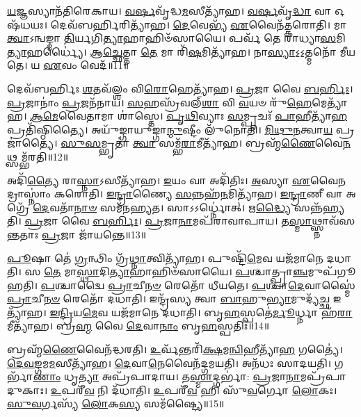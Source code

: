 \-\ul{𑌯}\-𑌜𑍍𑌞𑌸𑍍𑌯𑌾𑌨᳴𑌤𑌿𑌰𑍇𑌕𑌾𑌯।
\-\ul{𑌵}\-\-\ul{𑌰𑍍}\-𑌷𑌵𑍃᳴𑌦𑍍𑌧\-\ul{𑌮}\-𑌸𑍀𑌤𑍍𑌯𑌾᳴𑌹।
\-\ul{𑌵}\-\-\ul{𑌰𑍍}\-𑌷𑌵𑍃᳴\-\ul{𑌦𑍍𑌧𑌾} 𑌵𑌾 𑌓𑌷᳴𑌧𑌯𑌃।
𑌦𑍇𑌵᳴𑌬𑌰𑍍\mbox{}\-\ul{𑌹𑌿}\-𑌰𑌿𑌤𑍍𑌯𑌾᳴𑌹।
\-\ul{𑌦𑍇}\-𑌵𑍇𑌭𑍍𑌯᳴ \ul{𑌏}\-𑌵𑍈𑌨᳴𑌤𑍍𑌕𑌰𑍋𑌤𑌿।
𑌮𑌾 \ul{𑌤𑍍𑌵𑌾}\-\-𑌽𑌨𑍍𑌵𑌙𑍍𑌮𑌾 \ul{𑌤𑌿}\-𑌰𑍍𑌯𑌗𑌿\-\ul{𑌤𑍍𑌯𑌾}\-𑌹𑌾𑌹𑌿𑍞᳴𑌸𑌾𑌯𑍈।
𑌪𑌰𑍍𑌵᳴ 𑌤𑍇 𑌰𑌾𑌧𑍍𑌯𑌾\-\ul{𑌸}\-𑌮𑌿\-\ul{𑌤𑍍𑌯𑌾}\-𑌹𑌰𑍍𑌧𑍍𑌯𑍈॑।
\-\ul{𑌆}\-\-\ul{𑌚𑍍𑌛𑍇}\-𑌤𑍍𑌤𑌾 \ul{𑌤𑍇} 𑌮𑌾 𑌰𑌿᳴\-\ul{𑌷}\-𑌮𑌿𑌤𑍍𑌯𑌾᳴𑌹।
𑌨𑌾\-\ul{𑌸𑍍𑌯𑌾}\-𑌽॒𑌽॒𑌤𑍍𑌮𑌨𑍋᳴ 𑌮𑍀𑌯𑌤𑍇।
𑌯 \ul{𑌏}\-𑌵𑌂 𑌵𑍇𑌦᳴॥11॥

𑌦𑍇𑌵᳴𑌬𑌰𑍍\mbox{}𑌹𑌿𑌃 \ul{𑌶}\-𑌤𑌵᳴𑌲𑍍\mbox{}\-\ul{𑌶𑌂} 𑌵𑌿\-\ul{𑌰𑍋}\-𑌹𑍇𑌤𑍍𑌯𑌾᳴𑌹।
\-\ul{𑌪𑍍𑌰}\-𑌜𑌾 𑌵𑍈 \ul{𑌬}\-\-\ul{𑌰𑍍}\-𑌹𑌿𑌃।
\-\ul{𑌪𑍍𑌰}\-𑌜𑌾𑌨𑌾𑌂॑ \ul{𑌪𑍍𑌰}\-𑌜𑌨᳴𑌨𑌾𑌯।
\-\ul{𑌸}\-𑌹𑌸𑍍𑌰᳴𑌵𑌲𑍍‌\-\ul{𑌶𑌾} 𑌵𑌿 \ul{𑌵}\-𑌯𑍞 𑌰𑍁᳴\-\ul{𑌹𑍇}\-𑌮𑍇𑌤𑍍𑌯𑌾᳴𑌹।
\-\ul{𑌆}\-\-\-\ul{𑌮𑍇}\-𑌵𑍈𑌤𑌾𑌮𑌾 𑌶𑌾॑𑌸𑍍𑌤𑍇।
\-\ul{𑌪𑍃}\-\-\ul{𑌥𑌿}\-𑌵𑍍𑌯𑌾𑌃 \ul{𑌸}\-𑌮𑍍𑌪𑍃𑌚𑌃᳴ \ul{𑌪𑌾}\-𑌹𑍀𑌤𑍍𑌯𑌾᳴\-\ul{𑌹} 𑌪𑍍𑌰𑌤𑌿᳴\-𑌷𑍍𑌠𑌿𑌤𑍍𑌯𑍈।
𑌅𑌯𑍁᳴𑌙𑍍𑌗𑌾𑌯𑍁𑌙𑍍𑌗𑌾\-\ul{𑌨𑍍𑌮𑍁}\-𑌷𑍍𑌟𑍀𑌂 𑌲𑍁᳴𑌨𑍋𑌤𑌿।
\-\ul{𑌮𑌿}\-\-\ul{𑌥𑍁}\-\-\ul{𑌨}\-𑌤𑍍𑌵𑌾\-\ul{𑌯} 𑌪𑍍𑌰𑌜𑌾॑𑌤𑍍𑌯𑍈।
\-\ul{𑌸𑍁}\-\-\ul{𑌸}\-𑌮𑍍𑌭𑍃𑌤𑌾॑ \ul{𑌤𑍍𑌵𑌾} 𑌸𑌮𑍍𑌭᳴\-\ul{𑌰𑌾}\-𑌮𑍀𑌤𑍍𑌯𑌾᳴𑌹।
𑌬𑍍𑌰𑌹𑍍𑌮᳴\-\ul{𑌣𑍈}\-𑌵𑍈\-\ul{𑌨}\-𑌥𑍍𑌸𑌮𑍍𑌭᳴𑌰𑌤𑌿॥12॥

𑌅𑌦𑌿᳴\-\ul{𑌤𑍍𑌯𑍈} 𑌰𑌾\-\ul{𑌸𑍍𑌨𑌾}\-\-𑌽𑌸𑍀𑌤𑍍𑌯𑌾᳴𑌹।
\-\ul{𑌇}\-𑌯𑌂 𑌵𑌾 𑌅𑌦𑌿᳴𑌤𑌿𑌃।
\-\ul{𑌅}\-𑌸𑍍𑌯𑌾 \ul{𑌏}\-𑌵𑍈\-\ul{𑌨}\-𑌦𑍍𑌰𑌾𑌸𑍍𑌨𑌾𑌂॑ 𑌕𑌰𑍋𑌤𑌿।
\-\ul{𑌇}\-\-\ul{𑌨𑍍𑌦𑍍𑌰𑌾}\-𑌣𑍍𑌯𑍈 \ul{𑌸}\-𑌨𑍍𑌨𑌹᳴\-\ul{𑌨}\-𑌮𑌿𑌤𑍍𑌯𑌾᳴𑌹।
\-\ul{𑌇}\-\-\ul{𑌨𑍍𑌦𑍍𑌰𑌾}\-𑌣𑍀 𑌵𑌾 𑌅𑌗𑍍𑌰𑍇᳴ \ul{𑌦𑍇}\-𑌵𑌤𑌾᳴\-\ul{𑌨𑌾}\-\-\ul{𑍞} 𑌸𑌮᳴𑌨𑌹𑍍𑌯𑌤।
𑌸𑌾𑌽𑌽𑌰𑍍𑌧𑍍𑌨𑍋॑𑌤𑍍।
𑌋\-\ul{𑌦𑍍𑌧𑍍𑌯𑍈} 𑌸𑌨𑍍𑌨᳴𑌹𑍍𑌯𑌤𑌿।
\-\ul{𑌪𑍍𑌰}\-𑌜𑌾 𑌵𑍈 \ul{𑌬}\-\-\ul{𑌰𑍍}\-𑌹𑌿𑌃।
\-\ul{𑌪𑍍𑌰}\-𑌜𑌾\-\ul{𑌨𑌾}\-𑌮𑌪᳴𑌰𑌾𑌵𑌾𑌪𑌾𑌯।
𑌤\-\ul{𑌸𑍍𑌮𑌾}\-𑌥𑍍𑌸𑍍𑌨𑌾𑌵᳴𑌸𑌨𑍍𑌤𑌤𑌾𑌃 \ul{𑌪𑍍𑌰}\-𑌜𑌾 𑌜𑌾᳴𑌯𑌨𑍍𑌤𑍇॥13॥

\-\ul{𑌪𑍂}\-𑌷𑌾 𑌤𑍇॑ \ul{𑌗𑍍𑌰}\-𑌨𑍍𑌥𑌿𑌂 𑌗𑍍𑌰᳴\-\ul{𑌥𑍍𑌨𑌾}\-𑌤𑍍𑌵𑌿𑌤𑍍𑌯𑌾᳴𑌹।
𑌪𑍁𑌷𑍍𑌟𑌿᳴\-\ul{𑌮𑍇}\-𑌵 𑌯𑌜᳴𑌮𑌾𑌨𑍇 𑌦𑌧𑌾𑌤𑌿।
𑌸 \ul{𑌤𑍇} 𑌮𑌾\-\ul{𑌸𑍍𑌥𑌾}\-𑌦𑌿\-\ul{𑌤𑍍𑌯𑌾}\-𑌹𑌾𑌹𑌿𑍞᳴𑌸𑌾𑌯𑍈।
\-\ul{𑌪}\-𑌶𑍍𑌚𑌾𑌤𑍍𑌪𑍍𑌰𑌾\-\ul{𑌞𑍍𑌚}\-𑌮𑍁𑌪᳴𑌗𑍂𑌹𑌤𑌿।
\-\ul{𑌪}\-𑌶𑍍𑌚𑌾𑌦𑍍𑌵𑍈 \ul{𑌪𑍍𑌰𑌾}\-𑌚𑍀\-\ul{𑌨}\-\-\ul{𑍞} 𑌰𑍇𑌤𑍋᳴ 𑌧𑍀𑌯𑌤𑍇।
\-\ul{𑌪}\-𑌶𑍍𑌚𑌾\-\ul{𑌦𑍇}\-𑌵𑌾𑌸𑍍𑌮𑍈॑ \ul{𑌪𑍍𑌰𑌾}\-𑌚𑍀\-\ul{𑌨}\-\-\ul{𑍞} 𑌰𑍇𑌤𑍋᳴ 𑌦𑌧𑌾𑌤𑌿।
𑌇𑌨𑍍𑌦𑍍𑌰᳴𑌸𑍍𑌯 𑌤𑍍𑌵𑌾 \ul{𑌬𑌾}\-𑌹𑍁\-\ul{𑌭𑍍𑌯𑌾}\-𑌮𑍁𑌦𑍍𑌯᳴\-\ul{𑌚𑍍𑌛} 𑌇𑌤𑍍𑌯𑌾᳴𑌹।
\-\ul{𑌇}\-\-\ul{𑌨𑍍𑌦𑍍𑌰𑌿}\-𑌯\-\ul{𑌮𑍇}\-𑌵 𑌯𑌜᳴𑌮𑌾𑌨𑍇 𑌦𑌧𑌾𑌤𑌿।
𑌬𑍃\-\ul{𑌹}\-𑌸𑍍𑌪𑌤𑍇॑\-\ul{𑌰𑍍𑌮𑍂}\-𑌰𑍍𑌧𑍍𑌨𑌾 𑌹᳴\-\ul{𑌰𑌾}\-𑌮𑍀𑌤𑍍𑌯𑌾᳴𑌹।
𑌬𑍍𑌰\-\ul{𑌹𑍍𑌮} 𑌵𑍈 \ul{𑌦𑍇}\-𑌵𑌾\-\ul{𑌨𑌾𑌂} 𑌬𑍃\-\ul{𑌹}\-𑌸𑍍𑌪𑌤𑌿𑌃᳴॥14॥

𑌬𑍍𑌰𑌹𑍍𑌮᳴\-\ul{𑌣𑍈}\-𑌵𑍈𑌨᳴𑌦𑍍𑌧𑌰𑌤𑌿।
\-\ul{𑌉}\-𑌰𑍍𑌵᳴𑌨𑍍𑌤𑌰𑌿᳴\-\ul{𑌕𑍍𑌷}\-𑌮\-\ul{𑌨𑍍𑌵𑌿}\-𑌹𑍀𑌤𑍍𑌯𑌾᳴\-\ul{𑌹} 𑌗𑌤𑍍𑌯𑍈॑।
\-\ul{𑌦𑍇}\-\-\ul{𑌵}\-\-\ul{𑌙𑍍𑌗}\-𑌮\-\ul{𑌮}\-𑌸𑍀\-𑌤𑍍𑌯𑌾᳴𑌹।
\-\ul{𑌦𑍇}\-𑌵𑌾\-\ul{𑌨𑍇}\-𑌵𑍈𑌨᳴𑌦𑍍𑌗𑌮𑌯𑌤𑌿।
𑌅𑌨᳴𑌧𑌃 𑌸𑌾𑌦𑌯𑌤𑌿।
𑌗𑌰𑍍𑌭𑌾᳴\-\ul{𑌣𑌾𑌂} 𑌧𑍃\-\ul{𑌤𑍍𑌯𑌾} 𑌅𑌪𑍍𑌰᳴𑌪𑌾𑌦𑌾𑌯।
𑌤\-\ul{𑌸𑍍𑌮𑌾}\-𑌦𑍍𑌗𑌰𑍍𑌭𑌾॑: \ul{𑌪𑍍𑌰}\-𑌜𑌾\-\ul{𑌨𑌾}\-𑌮𑌪𑍍𑌰᳴𑌪𑌾𑌦𑍁𑌕𑌾𑌃।
\-\ul{𑌉}\-𑌪𑌰𑍀᳴\-\ul{𑌵} 𑌨𑌿 𑌦᳴𑌧𑌾𑌤𑌿।
\-\ul{𑌉}\-𑌪𑌰𑍀᳴\-\ul{𑌵} 𑌹𑌿 𑌸𑍁᳴\-\ul{𑌵}\-𑌰𑍍𑌗𑍋 \ul{𑌲𑍋}\-𑌕𑌃।
\-\ul{𑌸𑍁}\-\-\ul{𑌵}\-𑌰𑍍𑌗𑌸𑍍𑌯᳴ \ul{𑌲𑍋}\-𑌕\-\ul{𑌸𑍍𑌯} 𑌸𑌮᳴𑌷𑍍𑌟𑍍𑌯𑍈॥15॥\anuvakamend[\-\ul{𑌸}\-\-\ul{𑌯𑍋}\-\-\ul{𑌨𑌿}\-𑌤𑍍𑌵𑌾𑌯᳴ \ul{𑌸𑍍𑌵}\-𑌧𑌾𑌕𑍃᳴\-\ul{𑌤𑌾}\-\-𑌽𑌸𑍀𑌤𑍍𑌯𑌾᳴𑌹 𑌦𑌾\-\ul{𑌯𑌾}\-𑌦𑍍𑌵𑍇𑌦᳴ 𑌭𑌰𑌤𑌿 𑌜𑌾𑌯\-\ul{𑌨𑍍𑌤𑍇} 𑌬𑍃\-\ul{𑌹}\-𑌸𑍍𑌪\-\ul{𑌤𑌿𑌃} 𑌸𑌮᳴𑌷𑍍𑌟𑍍𑌯𑍈]

